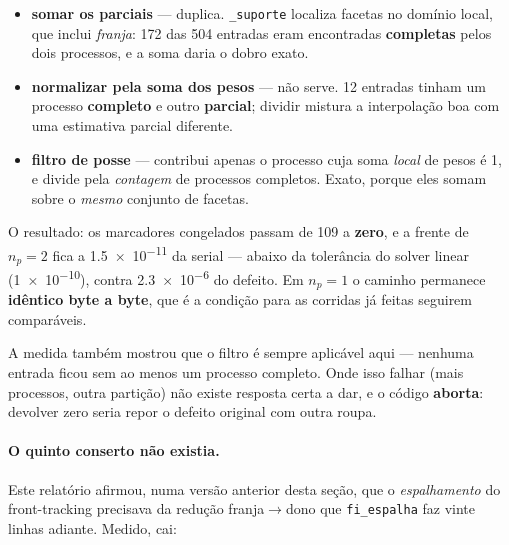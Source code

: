 \begin{itemize}
  \item \textbf{somar os parciais} --- duplica. \texttt{\_suporte} localiza
    facetas no dom\'inio local, que inclui \emph{franja}: 172 das 504 entradas
    eram encontradas \textbf{completas} pelos dois processos, e a soma daria o
    dobro exato.
  \item \textbf{normalizar pela soma dos pesos} --- n\~ao serve. 12 entradas
    tinham um processo \textbf{completo} e outro \textbf{parcial}; dividir mistura
    a interpola\c{c}\~ao boa com uma estimativa parcial diferente.
  \item \textbf{filtro de posse} --- contribui apenas o processo cuja soma
    \emph{local} de pesos \'e 1, e divide pela \emph{contagem} de processos
    completos. Exato, porque eles somam sobre o \emph{mesmo} conjunto de facetas.
\end{itemize}

O resultado: os marcadores congelados passam de 109 a \textbf{zero}, e a frente de
$n_p=2$ fica a \num{1.5e-11} da serial --- abaixo da toler\^ancia do solver linear
(\num{1e-10}), contra \num{2.3e-6} do defeito. Em $n_p=1$ o caminho permanece
\textbf{id\^entico byte a byte}, que \'e a condi\c{c}\~ao para as corridas j\'a
feitas seguirem compar\'aveis.

A medida tamb\'em mostrou que o filtro \'e sempre aplic\'avel aqui --- nenhuma
entrada ficou sem ao menos um processo completo. Onde isso falhar (mais processos,
outra parti\c{c}\~ao) n\~ao existe resposta certa a dar, e o c\'odigo
\textbf{aborta}: devolver zero seria repor o defeito original com outra roupa.

\paragraph{O quinto conserto n\~ao existia.} Este relat\'orio afirmou, numa vers\~ao
anterior desta se\c{c}\~ao, que o \emph{espalhamento} do front-tracking precisava
da redu\c{c}\~ao franja$\to$dono que \texttt{fi\_espalha} faz vinte linhas adiante.
Medido, cai:


